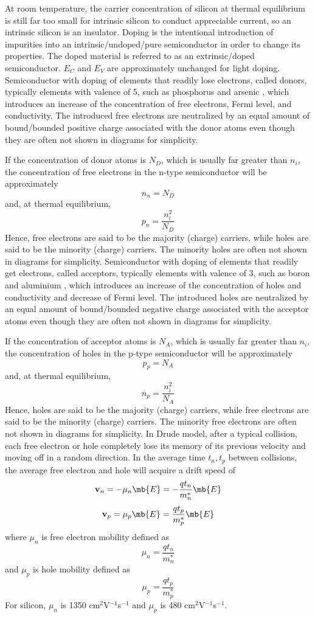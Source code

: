 \documentclass[a4paper,12pt]{report}
\begin{document}
At room temperature, the carrier concentration of silicon at thermal equilibrium is still far too small for intrinsic silicon to conduct appreciable current, so an intrinsic silicon is an insulator.
Doping is the intentional introduction of impurities into an intrinsic/undoped/pure semiconductor in order to change its properties. The doped material is referred to as an extrinsic/doped semiconductor. $E_C$ and $E_V$ are approximately unchanged for light doping.
Semiconductor with doping of elements that readily lose electrons, called donors, typically elements with valence of 5, such as phosphorus  and arsenic , which introduces an increase of the concentration of free electrons, Fermi level, and conductivity. The introduced free electrons are neutralized by an equal amount of bound/bounded positive charge associated with the donor atoms even though they are often not shown in diagrams for simplicity.

If the concentration of donor atoms is $N_D$, which is usually far greater than $n_i$, the concentration of free electrons in the n-type semiconductor will be approximately
\[n_n=N_D\]
and, at thermal equilibrium,
\[p_n=\frac{n_i^2}{N_D}\]
Hence, free electrons are said to be the majority (charge) carriers, while holes are said to be the minority (charge) carriers. The minority holes are often not shown in diagrams for simplicity.
Semiconductor with doping of elements that readily get electrons, called acceptors, typically elements with valence of 3, such as boron  and aluminium , which introduces an increase of the concentration of holes and conductivity and decrease of Fermi level. The introduced holes are neutralized by an equal amount of bound/bounded negative charge associated with the acceptor atoms even though they are often not shown in diagrams for simplicity.

If the concentration of acceptor atoms is $N_A$, which is usually far greater than $n_i$, the concentration of holes in the p-type semiconductor will be approximately
\[p_p=N_A\]
and, at thermal equilibrium,
\[n_p=\frac{n_i^2}{N_A}\]
Hence, holes are said to be the majority (charge) carriers, while free electrons are said to be the minority (charge) carriers. The minority free electrons are often not shown in diagrams for simplicity.
In Drude model, after a typical collision, each free electron or hole completely lose its memory of its previous velocity and moving off in a random direction. In the average time $t_n,t_p$ between collisions, the average free electron and hole will acquire a drift speed of
\[\mathbf{v}_n=-\mu_n\mb{E}=-\frac{qt_n}{m_n^*}\mb{E}\]
\[\mathbf{v}_p=\mu_p\mb{E}=\frac{qt_p}{m_p^*}\mb{E}\]
where $\mu_n$ is free electron mobility defined as
\[\mu_n=\frac{qt_n}{m_n^*}\]
and $\mu_p$ is hole mobility defined as
\[\mu_p=\frac{qt_p}{m_p^*}\]
For silicon, $\mu_n$ is 1350 cm$^2$V$^{-1}$s$^{-1}$ and $\mu_p$ is 480 cm$^2$V$^{-1}$s$^{-1}$.
\end{document}
